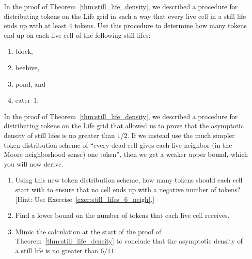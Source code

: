 \begin{multicols}{2}
	
	\mfilbreak
	
	
	\begin{problem}\label{exer:still_life_tokens}
		In the proof of Theorem~\ref{thm:still_life_density}, we described a procedure for distributing tokens on the Life grid in such a way that every live cell in a still life ends up with at least $4$ tokens. Use this procedure to determine how many tokens end up on each live cell of the following still lifes:\smallskip
		
		\begin{enumerate}[label=\bf\color{ocre}(\alph*)]
			\item block,
			
			\item beehive,
			
			\item pond, and
			
			\item eater~1.
		\end{enumerate}
	\end{problem}
	
	
	\mfilbreak
	
	
	\begin{problemstar}\label{exer:sl_density_611}
		In the proof of Theorem~\ref{thm:still_life_density}, we described a procedure for distributing tokens on the Life grid that allowed us to prove that the asymptotic density of still lifes is no greater than $1/2$. If we instead use the much simpler token distribution scheme of ``every dead cell gives each live neighbor (in the Moore neighborhood sense) one token'', then we get a weaker upper bound, which you will now derive.\smallskip
		
		\begin{enumerate}[label=\bf\color{ocre}(\alph*)]
			\item Using this new token distribution scheme, how many tokens should each cell start with to ensure that no cell ends up with a negative number of tokens? [Hint: Use Exercise~\ref{exer:still_lifes_6_neigh}.]
			
			\item Find a lower bound on the number of tokens that each live cell receives.
			
			\item Mimic the calculation at the start of the proof of Theorem~\ref{thm:still_life_density} to conclude that the asymptotic density of a still life is no greater than $6/11$.
		\end{enumerate}
	\end{problemstar}
	

\end{multicols}
